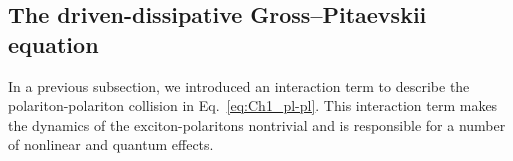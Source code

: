 \subsection{The driven-dissipative Gross--Pitaevskii equation}
In a previous subsection, we introduced an interaction term to describe the polariton-polariton collision in Eq.~\eqref{eq:Ch1_pl-pl}.
This interaction term makes the dynamics of the exciton-polaritons nontrivial and is responsible for a number of nonlinear and quantum effects.
%
%


